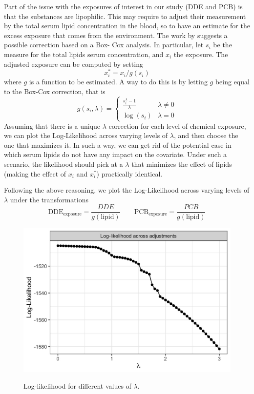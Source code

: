 \documentclass[10pt]{jmlr}%
\begin{document}
Part of the issue with the exposures of interest in our study (DDE and PCB) is that the substances are lipophilic. This may require to adjust their measurement by the total serum lipid concentration in the blood, so to have an estimate for the excess exposure that comes from the environment. The work by \cite{Li_Long_Duns} suggests a possible correction based on a Box- Cox analysis. In particular, let $s_i$ be the measure for the total lipids serum concentration, and $x_i$ the exposure. The adjusted exposure can be computed by setting 
\begin{equation}
x_i^* = x_i/g(s_i)
\end{equation} 
where $g$ is a function to be estimated. A way to do this is by letting $g$ being equal to the Box-Cox correction, that is
\begin{equation}
g(s_i,\lambda) = 
\begin{cases} 
\frac{s_i^\lambda-1}{\lambda} & \lambda \neq 0 \\
\log(s_i) & \lambda =0 
\end{cases}
\end{equation}
Assuming that there is a unique $\lambda$ correction for each level of chemical exposure, we can plot the Log-Likelihood across varying levels of $\lambda$, and then choose the one that maximizes it. In such a way, we can get rid of the potential case in which serum lipids do not have any impact on the covariate. Under such a scenario, the likelihood should pick at a $\lambda$ that minimizes the effect of lipids (making the effect of $x_i$ and $x_i^*$) practically identical. 

Following the above reasoning, we plot the Log-Likelihood across varying levels of $\lambda$  under the transformations
\begin{equation}
\textrm{DDE}_{\text{exposure}} = \frac{DDE}{g(\text{lipid})} \qquad \textrm{PCB}_{\text{exposure}} = \frac{PCB}{g(\text{lipid})}
\end{equation}


\begin{figure}[htbp]
	\centering
	\caption{Log-likelihood for different values of $\lambda$.}
	\includegraphics[width=0.7\linewidth]{BocCox}
	\label{fig:boxcox}
\end{figure}
\end{document}
